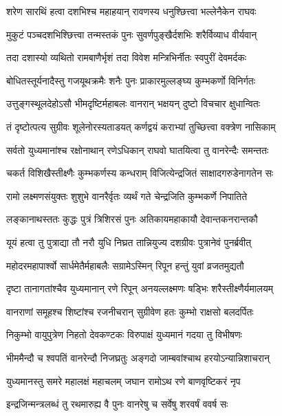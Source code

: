 \twolineshloka
{शरेण सारथिं हत्वा दशभिश्च महाहयान्}
{रावणस्य धनुश्छित्त्वा भल्लेनैकेन राघवः} %

\twolineshloka
{मुकुटं पञ्चदशभिश्छित्त्वा तन्मस्तकं पुनः}
{सुवर्णपुङ्खैर्दशभिः शरैर्विव्याध वीर्यवान्} %

\twolineshloka
{तदा दशास्यो व्यथितो रामबाणैर्भृशं तदा}
{विवेश मन्त्रिभिर्नीतः स्वपुरीं देवमर्दकः} %

\twolineshloka
{बोधितस्तूर्यनादैस्तु गजयूथक्रमैः शनैः}
{पुनः प्राकारमुल्लङ्घ्य कुम्भकर्णो विनिर्गतः} %

\twolineshloka
{उत्तुङ्गस्थूलदेहोऽसौ भीमदृष्टिर्महाबलः}
{वानरान् भक्षयन् दुष्टो विचचार क्षुधान्वितः} %

\twolineshloka
{तं दृष्टोत्पत्य सुग्रीवः शूलेनोरस्यताडयत्}
{कर्णद्वयं कराभ्यां तुच्छित्त्वा वक्त्रेण नासिकाम्} %

\twolineshloka
{सर्वतो युध्यमानांश्च रक्षोनाथान् रणेऽधिकान्}
{राघवो घातयित्वा तु वानरेन्दैः समन्ततः} %

\twolineshloka
{चकर्त विशिखैस्तीक्ष्णैः कुम्भकर्णस्य कन्धराम्}
{विजित्येन्द्रजितं साक्षादगरुडेनागतेन सः} %

\twolineshloka
{रामो लक्ष्मणसंयुक्तः शुशुभे वानरैर्वृतः}
{व्यर्थं गते चेन्द्रजिति कुम्भकर्णे निपातिते} %

\twolineshloka
{लङ्कानाथस्ततः कुद्धः पुत्रं त्रिशिरसं पुनः}
{अतिकायमहाकायौ देवान्तकनरान्तकौ} %

\twolineshloka
{यूयं हत्वा तु पुत्राद्या तौ नरौ युधि निघ्रत}
{तान्नियुज्य दशग्रीवः पुत्रानेवं पुनर्ब्रवीत्} %

\twolineshloka
{महोदरमहापार्श्वो सार्धमेतैर्महाबलैः}
{सग्रामेऽस्मिन् रिपून हन्तुं युवां व्रजतमुद्यतौ} %

\twolineshloka
{दृष्टा तानागतांश्चैव युध्यमानान् रणे रिपून्}
{अनयल्लक्ष्मणः षड्भिः शरैस्तीक्ष्णैर्यमालयम्} %

\twolineshloka
{वानराणां समूहश्च शिष्टांश्च रजनीचरान्}
{सुग्रीवेण हतः कुम्भो राक्षसो बलदर्पितः} %

\twolineshloka
{निकुम्भो वायुपुत्रेण निहतो देवकण्टकः}
{विरुपाक्षं युध्यमानं गदया तु विभीषणः} %

\twolineshloka
{भीममैन्दौ च श्वपतिं वानरेन्दौ निजघ्रतुः}
{अङ्गदो जाम्बवांश्चाथ हरयोऽन्यान्निशाचरान्} %

\twolineshloka
{युध्यमानस्तु समरे महालक्षं महाचलम्}
{जघान रामोऽथ रणे बाणवृष्टिकरं नृप} %

\twolineshloka
{इन्द्रजिन्मन्त्रलब्धं तु रथमारुह्य वै पुनः}
{वानरेषु च सर्वेषु शरवर्षं ववर्ष सः} %

